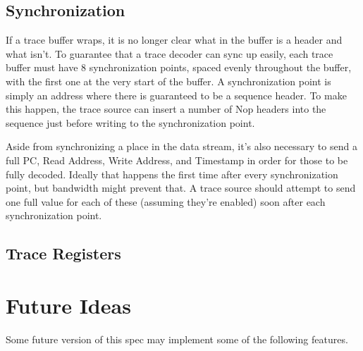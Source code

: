\documentclass{article}
\begin{document}
\subsection{Synchronization}

If a trace buffer wraps, it is no longer clear what in the buffer is a header
and what isn't. To guarantee that a trace decoder can sync up easily, each
trace buffer must have 8 synchronization points, spaced evenly throughout the
buffer, with the first one at the very start of the buffer. A synchronization
point is simply an address where there is guaranteed to be a sequence header.
To make this happen, the trace source can insert a number of Nop headers into
the sequence just before writing to the synchronization point.

Aside from synchronizing a place in the data stream, it's also necessary to
send a full PC, Read Address, Write Address, and Timestamp in order for those
to be fully decoded. Ideally that happens the first time after every
synchronization point, but bandwidth might prevent that. A trace source should
attempt to send one full value for each of these (assuming they're enabled)
soon after each synchronization point.

\subsection{Trace Registers}



\section{Future Ideas}
Some future version of this spec may implement some of the following features.
\end{document}
